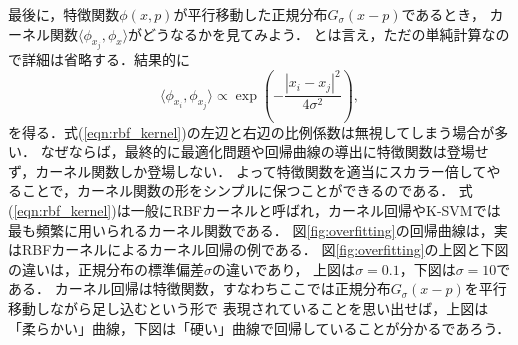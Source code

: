 最後に，特徴関数$\phi(x, p)$が平行移動した正規分布$G_{\sigma}(x - p)$であるとき，
カーネル関数$\langle \phi_{x_j}, \phi_x \rangle$がどうなるかを見てみよう．
とは言え，ただの単純計算なので詳細は省略する．結果的に
\begin{equation}
\langle \phi_{x_i}, \phi_{x_j} \rangle \propto \exp \left( - \frac{|x_i - x_j|^2}{4 \sigma^2} \right),
\label{eqn:rbf_kernel}
\end{equation}
を得る．式(\ref{eqn:rbf_kernel})の左辺と右辺の比例係数は無視してしまう場合が多い．
なぜならば，最終的に最適化問題や回帰曲線の導出に特徴関数は登場せず，カーネル関数しか登場しない．
よって特徴関数を適当にスカラー倍してやることで，カーネル関数の形をシンプルに保つことができるのである．
式(\ref{eqn:rbf_kernel})は一般にRBFカーネルと呼ばれ，カーネル回帰やK-SVMでは最も頻繁に用いられるカーネル関数である．
図\ref{fig:overfitting}の回帰曲線は，実はRBFカーネルによるカーネル回帰の例である．
図\ref{fig:overfitting}の上図と下図の違いは，正規分布の標準偏差$\sigma$の違いであり，
上図は$\sigma = 0.1$，下図は$\sigma = 10$である．
カーネル回帰は特徴関数，すなわちここでは正規分布$G_{\sigma}(x - p)$を平行移動しながら足し込むという形で
表現されていることを思い出せば，上図は「柔らかい」曲線，下図は「硬い」曲線で回帰していることが分かるであろう．

